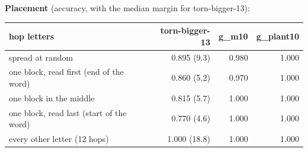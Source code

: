 \documentclass[paper=a4,fontsize=11pt,DIV=11,parskip=half,headings=small,numbers=noendperiod]{scrartcl}
\DeclareRobustCommand{\lead}[1]{\textsf{\bfseries\color{accent}#1}}
\DeclareRobustCommand{\code}[1]{{\fontseries{m}\ttfamily #1}}
\DeclareRobustCommand{\hdr}[1]{\textsf{\bfseries #1}}
\begin{document}
\lead{Placement} (accuracy, with the median margin for \code{torn-\allowbreak{}bigger-\allowbreak{}13}):

\begin{center}\small
\begin{tabular}{@{}>{\raggedright\arraybackslash}p{6.6cm} r r r@{}}
\toprule
\hdr{hop letters} & \hdr{\code{torn-\allowbreak{}bigger-\allowbreak{}13}} & \hdr{\code{g\_\allowbreak{}m10}} & \hdr{\code{g\_\allowbreak{}plant10}} \\
\midrule
spread at random & 0.895 (9.3) & 0.980 & 1.000 \\
one block, read first (end of the word) & 0.860 (5.2) & 0.970 & 1.000 \\
one block in the middle & 0.815 (5.7) & 1.000 & 1.000 \\
one block, read last (start of the word) & 0.770 (4.6) & 1.000 & 1.000 \\
every other letter (12 hops) & 1.000 (18.8) & 1.000 & 1.000 \\
\bottomrule
\end{tabular}
\end{center}
\end{document}
